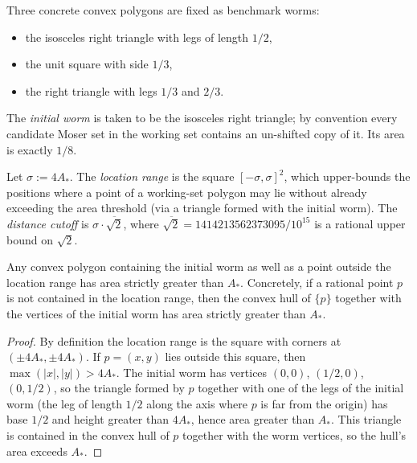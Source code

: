 \begin{definition}
  \label{def:benchmark-worms}
  \leanok
  Three concrete convex polygons are fixed as benchmark worms:
  \begin{itemize}
    \item the isosceles right triangle with legs of length $1/2$,
    \item the unit square with side $1/3$,
    \item the right triangle with legs $1/3$ and $2/3$.
  \end{itemize}
  The \emph{initial worm} is taken to be the isosceles right triangle; by
  convention every candidate Moser set in the working set contains an
  un-shifted copy of it. Its area is exactly $1/8$.
\end{definition}

\begin{definition}
  \label{def:locationRange}
  \leanok
  Let $\sigma := 4 A_*$. The \emph{location range} is the square
  $[-\sigma, \sigma]^2$, which upper-bounds the positions where a point of
  a working-set polygon may lie without already exceeding the area
  threshold (via a triangle formed with the initial worm). The
  \emph{distance cutoff} is $\sigma \cdot \overline{\sqrt{2}}$, where
  $\overline{\sqrt{2}} = 1414213562373095/10^{15}$ is a rational upper
  bound on $\sqrt 2$.
\end{definition}

\begin{proposition}
  \label{prop:locationRange-excludes}
  Any convex polygon containing the initial worm as well as a point
  outside the location range has area strictly greater than $A_*$.
  Concretely, if a rational point $p$ is not contained in the location
  range, then the convex hull of $\{p\}$ together with the vertices of
  the initial worm has area strictly greater than $A_*$.
\end{proposition}
\begin{proof}
  By definition the location range is the square with corners at
  $(\pm 4 A_*, \pm 4 A_*)$. If $p = (x, y)$ lies outside this square,
  then $\max(|x|, |y|) > 4 A_*$. The initial worm has vertices
  $(0,0)$, $(1/2, 0)$, $(0, 1/2)$, so the triangle formed by $p$
  together with one of the legs of the initial worm (the leg of
  length $1/2$ along the axis where $p$ is far from the origin) has
  base $1/2$ and height greater than $4 A_*$, hence area greater than
  $A_*$. This triangle is contained in the convex hull of $p$ together
  with the worm vertices, so the hull's area exceeds $A_*$.
\end{proof}

